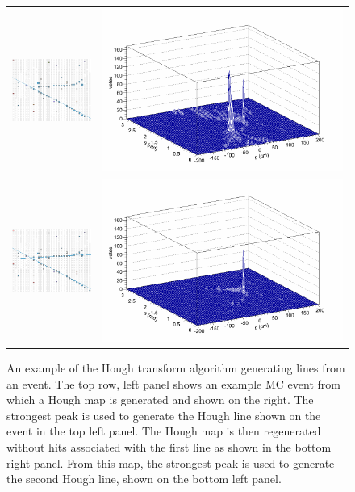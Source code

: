 \begin{figure}[htb]
  \centering
  \begin{tabular}{c c}
    \includegraphics[width=.47\textwidth]{figures/Hough/HoughEvent1.png} &
    \includegraphics[width=.47\textwidth]{figures/Hough/HMapSurf1.png} \\
    \includegraphics[width=.47\textwidth]{figures/Hough/HoughEvent2.png} &
    \includegraphics[width=.47\textwidth]{figures/Hough/HMapSurf2.png} \\
  \end{tabular}
  \caption[Hough Line Generation from a Hough Map]{An example of the Hough transform algorithm generating lines from an event. The top row, left panel shows an example MC event from which a Hough map is generated and shown on the right. The strongest peak is used to generate the Hough line shown on the event in the top left panel. The Hough map is then regenerated without hits associated with the first line as shown in the bottom right panel. From this map, the strongest peak is used to generate the second Hough line, shown on the bottom left panel.}
  \label{fig:Hough}
\end{figure}

